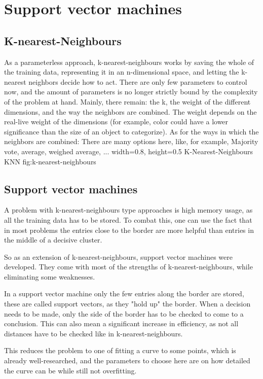 \section{Support vector machines}
\label{sec:SVM}
\subsection{K-nearest-Neighbours}
As a parameterless approach, k-nearest-neighbours works by saving the whole of the training data, representing it in an n-dimensional space, and letting the k-nearest neighbors decide how to act. There are only few parameters to control now, and the amount of parameters is no longer strictly bound by the complexity of the problem at hand. Mainly, there remain: the k, the weight of the different dimensions, and the way the neighbors are combined. 
The weight depends on the real-live weight of the dimensions (for example, color could have a lower significance than the size of an object to categorize).
As for the ways in which the neighbors are combined: There are many options here, like, for example, Majority vote, average, weighed average, ...
    {width=0.8\textwidth, height=0.5\textheight} %
    {K-Nearest-Neighbours}   %
    {KNN}   %
    {fig:k-nearest-neighbours}    %

\subsection{Support vector machines}
A problem with k-nearest-neighbours type approaches is high memory usage, as all the training data has to be stored. To combat this, one can use the fact that in most problems the entries close to the border are more helpful than entries in the middle of a decisive cluster.

So as an extension of k-nearest-neighbours, support vector machines were developed. They come with most of the strengths of k-nearest-neighbours, while eliminating some weaknesses.

In a support vector machine only the few entries along the border are stored, these are called support vectors, as they "hold up" the border. When a decision needs to be made, only the side of the border has to be checked to come to a conclusion. This can also mean a significant increase in efficiency, as not all distances have to be checked like in k-nearest-neighbours.

This reduces the problem to one of fitting a curve to some points, which is already well-researched, and the parameters to choose here are on how detailed the curve can be while still not overfitting.

